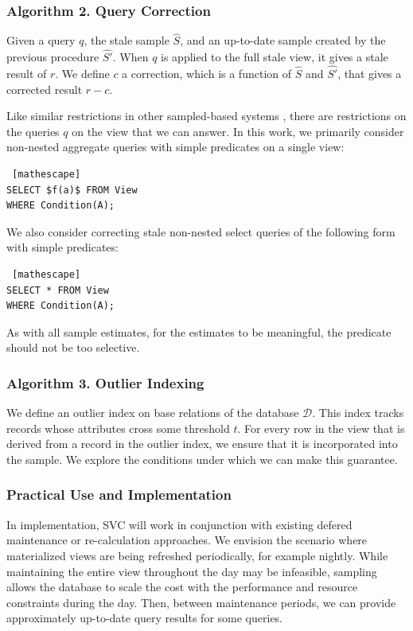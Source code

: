 
\subsubsection{Algorithm 2. Query Correction }
Given a query $q$, the stale sample $\hat{S}$, and an up-to-date sample created by the previous procedure $\hat{S'}$.
When $q$ is applied to the full stale view, it gives a stale result of $r$.
We define $c$ a correction, which is a function of $\hat{S}$ and $\hat{S'}$, that gives a corrected result $r-c$. 


Like similar restrictions in other sampled-based systems \cite{agarwalknowing}, there are restrictions on the queries $q$ on the view that we can answer.  
In this work, we primarily consider non-nested aggregate queries with simple predicates on a single view:
\begin{lstlisting} [mathescape]
SELECT $f(a)$ FROM View 
WHERE Condition(A);
\end{lstlisting}
We also consider correcting stale non-nested select queries of the following form with simple predicates:
\begin{lstlisting} [mathescape]
SELECT * FROM View 
WHERE Condition(A);
\end{lstlisting}
As with all sample estimates, for the estimates to be meaningful, the predicate should not be too selective.



\subsubsection{Algorithm 3. Outlier Indexing}
We define an outlier index on base relations of the database $\mathcal{D}$.
This index tracks records whose attributes cross some threshold $t$.
For every row in the view that is derived from a record in the outlier index, we ensure that it is incorporated into the sample.
We explore the conditions under which we can make this guarantee. 

\subsubsection{Practical Use and Implementation}
In implementation, SVC will work in conjunction with existing defered maintenance or re-calculation approaches.
We envision the scenario where materialized views are being refreshed periodically, for example nightly.
While maintaining the entire view throughout the day may be infeasible, sampling allows the database to scale the cost with the performance and resource constraints during the day.
Then, between maintenance periods, we can provide approximately up-to-date query results for some queries.

